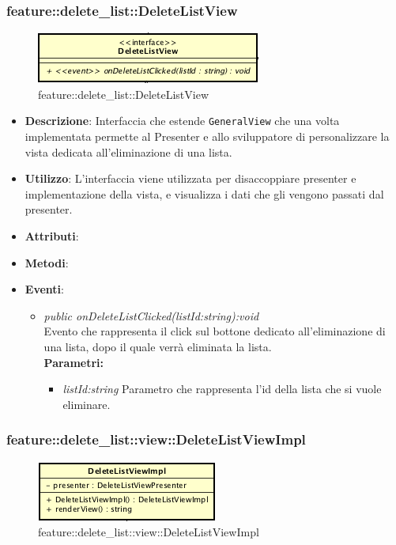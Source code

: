\subsubsection{feature::delete\_list::DeleteListView}

\label{feature::delete_list::DeleteListView}
\begin{figure}[H]
	\centering
	\includegraphics[scale=0.5]{Sezioni/SottosezioniST/img/app/DeleteListView.png}
	\caption{feature::delete\_list::DeleteListView}
\end{figure}

\begin{itemize}
\item \textbf{Descrizione}: Interfaccia che estende \texttt{GeneralView} che una volta implementata permette al Presenter e allo sviluppatore di personalizzare la vista dedicata all'eliminazione di una lista.
\item \textbf{Utilizzo}: L'interfaccia viene utilizzata per disaccoppiare presenter e implementazione della vista, e visualizza i dati che gli vengono passati dal presenter.
\item \textbf{Attributi}: 
\item \textbf{Metodi}:
\item \textbf{Eventi}:
	\begin{itemize}
	\item \textit{public onDeleteListClicked(listId:string):void}\\
	Evento che rappresenta il click sul bottone dedicato all'eliminazione di una lista, dopo il quale verrà eliminata la lista.
	\\ \textbf{Parametri:} \begin{itemize}
	\item \textit{listId:string}
	Parametro che rappresenta l'id della lista che si vuole eliminare.
	\end{itemize} 
	\end{itemize}
\end{itemize}

\subsubsection{feature::delete\_list::view::DeleteListViewImpl}

\label{feature::delete_list::view::DeleteListViewImpl}
\begin{figure}[H]
	\centering
	\includegraphics[scale=0.5]{Sezioni/SottosezioniST/img/app/DeleteListViewImpl.png}
	\caption{feature::delete\_list::view::DeleteListViewImpl}
\end{figure}

